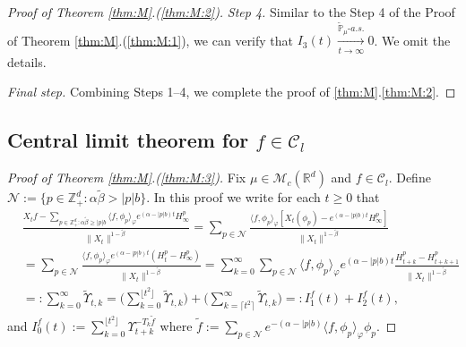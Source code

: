 \documentclass[12pt,a4paper]{amsart}
\theoremstyle{plain}
\theoremstyle{definition}
\numberwithin{equation}{section}
\begin{document}
\begin{proof}[Proof of Theorem \ref{thm:M}.(\ref{thm:M:2})]
  \emph{Step 4.}
  Similar to the Step 4 of the Proof of Theorem \ref{thm:M}.(\ref{thm:M:1}), we can verify that $I_3(t) \xrightarrow[t\to \infty]{\widetilde {\mathbb P}_\mu \text{-} a.s.} 0$.
  We omit the details.

 	\emph{Final step.} Combining Steps 1--4, we complete the proof of \ref{thm:M}.\eqref{thm:M:2}.
\end{proof}
 
\subsection{Central limit theorem for $f\in \mathcal C_l$}
\label{sec: large rate clt}
\begin{proof}[Proof of Theorem \ref{thm:M}.(\ref{thm:M:3})]
Fix $\mu \in \mathcal M_c(\mathbb R^d)$ and $f \in \mathcal C_l$.
Define $\mathcal N:= \{p\in \mathbb Z_+^d: \alpha \tilde \beta > |p|b\}$.
In this proof we write for each $t\geq 0$ that
\begin{align}
  & \frac{X_tf - \sum_{p\in \mathbb Z_+^d: \alpha \tilde \beta \geq |p|b} \langle f,\phi_p\rangle_\varphi e^{(\alpha - |p|b)t}H_\infty^p}{\|X_t\|^{1- \tilde \beta}}
    = \sum_{p\in \mathcal N}\frac{ \langle f,\phi_p\rangle_\varphi [X_t(\phi_p) - e^{(\alpha - |p|b)t}H_\infty^p]}{\|X_t\|^{1- \tilde \beta}}
  \\& = \sum_{p \in \mathcal N} \frac{\langle f,\phi_p\rangle_\varphi e^{(\alpha - |p|b)t}(H_t^p - H_\infty^p)}{\|X_t\|^{1- \tilde \beta}}
   = \sum_{k=0}^\infty \sum_{p \in \mathcal N}  \langle f,\phi_p\rangle_\varphi e^{(\alpha - |p|b)t}\frac{ H_{t+k}^p - H_{t+k+1}^p}{\|X_t\|^{1- \tilde \beta}}
  \\ & =: \sum_{k=0}^\infty \widetilde \Upsilon_{t,k} 
  = \Big(\sum_{k = 0}^{\lfloor t^2 \rfloor}  \widetilde \Upsilon_{t,k} \Big) + \Big(\sum_{k = \lceil t^2 \rceil}^\infty  \widetilde \Upsilon_{t,k}\Big) 
  = : I^f_1(t) + I^f_2(t),
\end{align}
and $I^f_0(t):= \sum_{k = 0}^{\lfloor t^2 \rfloor} \Upsilon_{t+k}^{- T_k \tilde f}$ where $\tilde f := \sum_{p\in \mathcal N} e^{-(\alpha - |p|b)}\langle f, \phi_p \rangle_\varphi \phi_p$.


\end{proof}
\end{document}
